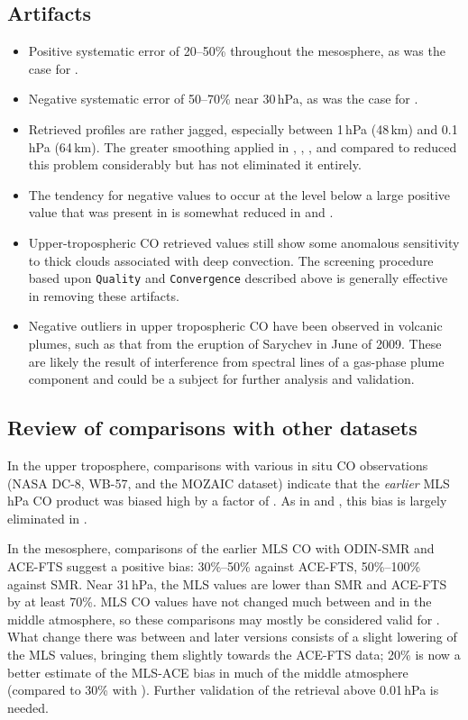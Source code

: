 \subsection{Artifacts}
\begin{itemize}
  \item Positive systematic error of 20--50\% throughout the mesosphere, as was the case for \prevv.
  \item Negative systematic error of 50--70\% near 30\,hPa, as was the case for \prevv.
  \item Retrieved profiles are rather jagged, especially between 1\,hPa (48\,km) and 0.1\,hPa (64\,km). The greater smoothing applied in \thisv, \prevv, \viv, and \viii compared to \vii reduced this problem considerably but has not eliminated it entirely.
  \item The tendency for negative values to occur at the level below a large positive value that was present in \viv is somewhat reduced in \thisv and \prevv.
  \item Upper-tropospheric \thisv CO retrieved values still show some anomalous sensitivity to thick clouds associated with deep convection. The screening procedure based upon \texttt{Quality} and \texttt{Convergence} described above is generally effective in removing these artifacts.
  \item Negative outliers in upper tropospheric CO have been observed in volcanic plumes, such as that from the eruption of Sarychev in June of 2009. These are likely the result of interference from spectral lines of a gas-phase plume component and could be a subject for further analysis and validation.
\end{itemize}

\subsection{Review of comparisons with other datasets}

In the upper troposphere, comparisons with various in situ CO observations (NASA DC-8, WB-57, and the MOZAIC dataset) indicate that the \emph{earlier} MLS \,hPa CO product was biased high by a factor of . As in \viv and \prevv, this bias is largely eliminated in \thisv.

In the mesosphere, comparisons of the earlier \vii MLS CO with ODIN-SMR and ACE-FTS suggest a positive bias: 30\%--50\% against ACE-FTS, 50\%--100\% against SMR. Near 31\,hPa, the MLS values are lower than SMR and ACE-FTS by at least 70\%. MLS CO values have not changed much between \vii and \thisv in the middle atmosphere, so these comparisons may mostly be considered valid for \thisv. What change there was between \vii and later versions consists of a slight lowering of the MLS values, bringing them slightly towards the ACE-FTS data; 20\% is now a better estimate of the MLS-ACE bias in much of the middle atmosphere (compared to 30\% with \vii).
Further validation of the \thisv retrieval above 0.01\,hPa is needed.

